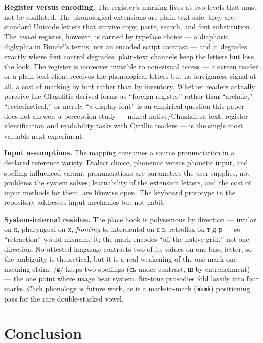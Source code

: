 \documentclass[12pt]{article}
\newcommand{\cz}[1]{{\chu #1}}
\newcommand{\ph}[1]{{\ipafont/#1/}}
\begin{document}
\textbf{Register versus encoding.} The register's marking lives at two levels that must not be conflated. The phonological extensions are plain-text-safe: they are standard Unicode letters that survive copy, paste, search, and font substitution. The \emph{visual} register, however, is carried by typeface choice — a diaphasic diglyphia in Bun\v{c}i\'c's terms, not an encoded script contrast — and it degrades exactly where font control degrades: plain-text channels keep the letters but lose the look. The register is moreover invisible to non-visual access — a screen reader or a plain-text client receives the phonological letters but no foreignness signal at all, a cost of marking by font rather than by inventory. Whether readers actually perceive the Glagolitic-derived forms as ``foreign register'' rather than ``archaic,'' ``ecclesiastical,'' or merely ``a display font'' is an empirical question this paper does not answer; a perception study — mixed native/Chuzhditsa text, register-identification and readability tasks with Cyrillic readers — is the single most valuable next experiment.

\textbf{Input assumptions.} The mapping consumes a source pronunciation in a declared reference variety. Dialect choice, phonemic versus phonetic input, and spelling-influenced variant pronunciations are parameters the user supplies, not problems the system solves; learnability of the extension letters, and the cost of input methods for them, are likewise open. The keyboard prototype in the repository addresses input mechanics but not habit.

\textbf{System-internal residue.} The place hook is polysemous by direction — uvular on \cz{к}, pharyngeal on \cz{х}, \emph{fronting} to interdental on \cz{с з}, retroflex on \cz{т д р} — so ``retraction'' would misname it; the mark encodes ``off the native grid,'' not one direction. No attested language contrasts two of its values on one base letter, so the ambiguity is theoretical, but it is a real weakening of the one-mark-one-meaning claim. \ph{ɕ} keeps two spellings (\cz{сь} under contrast, \cz{ш} by entrenchment) — the one point where usage beat system. Six-tone prosodies fold lossily into four marks. Click phonology is future work, as is a mark-to-mark (\texttt{mkmk}) positioning pass for the rare double-stacked vowel.

\section{Conclusion}
\end{document}
